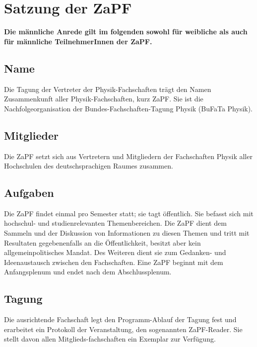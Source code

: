\documentclass[draft,12pt,oneside]{scrreprt}
\begin{document}
\chapter*{Satzung der ZaPF}

\textbf{Die männliche Anrede gilt im folgenden sowohl für weibliche
als auch für männliche TeilnehmerInnen der ZaPF.}

\section{Name}
Die Tagung der Vertreter der Physik-Fachschaften trägt den Namen Zusammenkunft
aller Physik-Fachschaften, kurz ZaPF.  Sie ist die Nachfolgeorganisation der
Bundes-Fachschaften-Tagung Physik (BuFaTa Physik).

\section{Mitglieder}
Die ZaPF setzt sich aus Vertretern und Mitgliedern der Fachschaften Physik
aller Hochschulen des deutschsprachigen Raumes zusammen.

\section{Aufgaben}
Die ZaPF findet einmal pro Semester statt; sie tagt öffentlich. Sie befasst
sich mit hochschul- und studienrelevanten Themenbereichen.  Die ZaPF dient dem
Sammeln und der Diskussion von Informationen zu diesen Themen und tritt mit
Resultaten gegebenenfalls an die Öffentlichkeit, besitzt aber kein
allgemeinpolitisches Mandat. Des Weiteren dient sie zum Gedanken- und
Ideenaustausch zwischen den Fachschaften. Eine ZaPF beginnt mit dem
Anfangsplenum und endet nach dem Abschlussplenum.

\section{Tagung}
Die ausrichtende Fachschaft legt den Programm-Ablauf der Tagung fest und
erarbeitet ein Protokoll der Veranstaltung, den sogenannten ZaPF-Reader. Sie
stellt davon allen Mitglieds-fachschaften ein Exemplar zur Verfügung.

\newpage
\end{document}
